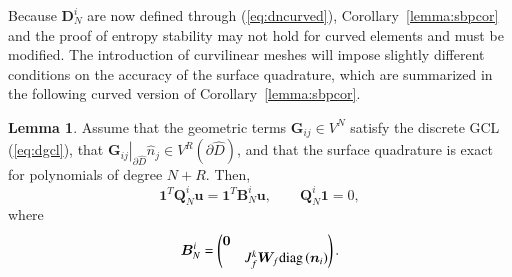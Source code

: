 \documentclass[preprint,10pt]{elsarticle}
\theoremstyle{definition}
\theoremstyle{lemma}
\newtheorem{lemma}{Lemma}
\theoremstyle{corollary}
\theoremstyle{theorem}
\theoremstyle{assumption}
\renewcommand{\hat}[1]{\widehat{#1}}
\newcommand{\LRp}[1]{\left( #1 \right)}
\newcommand{\LRl}[1]{\left. #1 \right|}
\newcommand{\diag}[1]{{\rm diag}\LRp{#1}}
\begin{document}
Because $\bm{D}^i_N$ are now defined through (\ref{eq:dncurved}), Corollary~\ref{lemma:sbpcor} and the proof of entropy stability may not hold for curved elements and must be modified.  The introduction of curvilinear meshes will impose slightly different conditions on the accuracy of the surface quadrature, which are summarized in the following curved version of Corollary~\ref{lemma:sbpcor}.
\begin{lemma}
Assume that the geometric terms $\bm{G}_{ij} \in V^N$ satisfy the discrete GCL (\ref{eq:dgcl}), that $\LRl{\bm{G}_{ij}}_{\partial \hat{D}}\hat{n}_j \in V^R\LRp{\partial \hat{D}}$, and that the surface quadrature is exact for polynomials of degree $N+R$.  Then, 
\[
\bm{1}^T\bm{Q}^i_N\bm{u} = \bm{1}^T\bm{B}^i_N \bm{u}, %
\qquad \bm{Q}^i_N \bm{1} = 0, 
\]
where 
\[
\bm{B}^i_N =  \begin{pmatrix}
\bm{0}&\\
& {J^k_f}\bm{W}_f \diag{{\bm{n}_i}}
\end{pmatrix}.
\]
\label{lemma:vdsbpcurved}
\end{lemma}
\end{document}
